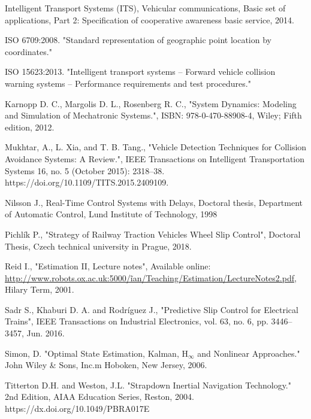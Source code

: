 \begin{thebibliography}{}
\newblock Intelligent Transport Systems (ITS), 
\newblock Vehicular communications, 
\newblock Basic set of applications, 
\newblock Part 2: Specification of cooperative awareness basic service, 2014.

\newblock ISO 6709:2008.
\newblock "Standard representation of geographic point location by coordinates."

\newblock ISO 15623:2013.
\newblock "Intelligent transport systems -- Forward vehicle collision warning systems -- Performance requirements and test procedures."

\newblock Karnopp D. C., Margolis D. L., Rosenberg R. C.,
\newblock "System Dynamics: Modeling and Simulation of Mechatronic Systems.",
\newblock ISBN: 978-0-470-88908-4, Wiley; Fifth edition, 2012.

\newblock Mukhtar, A., L. Xia, and T. B. Tang.,
\newblock "Vehicle Detection Techniques for Collision Avoidance Systems: A Review.",
\newblock IEEE Transactions on Intelligent Transportation Systems 16, no. 5 (October 2015): 2318–38. https://doi.org/10.1109/TITS.2015.2409109.

\newblock Nilsson J.,
\newblock Real-Time Control Systems with Delays,
\newblock Doctoral thesis, Department of Automatic Control, Lund Institute of Technology, 1998

\newblock Pichlík P., 
\newblock "Strategy of Railway Traction Vehicles Wheel Slip Control",
\newblock Doctoral Thesis, Czech technical university in Prague, 2018.

\newblock Reid I., 
\newblock "Estimation II, Lecture notes",
\newblock Available online:\\ \href{robots.ox.ac.uk:5000/\~ian/Teaching/Estimation/LectureNotes2.pdf}{http://www.robots.ox.ac.uk:5000/\~ian/Teaching/Estimation/LectureNotes2.pdf}, \\ 
\newblock Hilary Term, 2001.

\newblock Sadr S., Khaburi D. A. and Rodríguez J.,
\newblock "Predictive Slip Control for Electrical Trains",
\newblock IEEE Transactions on Industrial Electronics, vol. 63, no. 6, pp. 3446–3457, Jun. 2016.

\newblock Simon, D.
\newblock "Optimal State Estimation, Kalman, H$_\infty$ and Nonlinear Approaches."
\newblock John Wiley \& Sons, Inc.m Hoboken, New Jersey, 2006.

\newblock Titterton D.H. and Weston, J.L. 
\newblock "Strapdown Inertial Navigation Technology."
\newblock 2nd Edition, AIAA Education Series, Reston, 2004.
\newblock https://dx.doi.org/10.1049/PBRA017E


\end{thebibliography}

